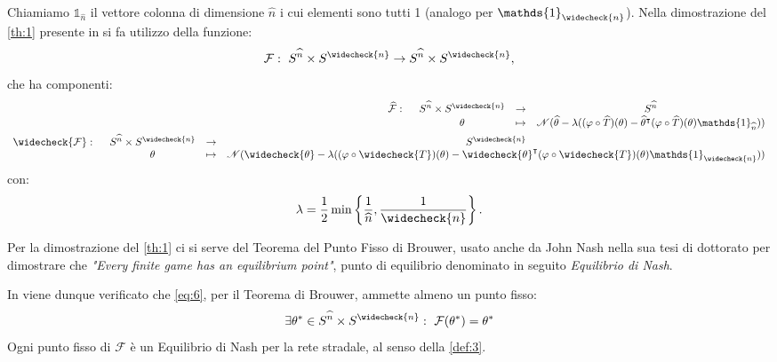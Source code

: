 Chiamiamo $\mathds{1}_{\widehat{n}}$ il vettore colonna di dimensione $\widehat{n}$ i cui elementi sono tutti 1 (analogo per $\mathds{1}_{\widecheck{n}}$).
Nella dimostrazione del \autoref{th:1} presente in \cite[Cap. 4]{MR4911797} si fa utilizzo della funzione:
\begin{equation}
    \mathcal{F}:\text{ } S^{\widehat{n}}\times S^{\widecheck{n}} \to S^{\widehat{n}}\times S^{\widecheck{n}},
    \label{eq:6}
\end{equation}
che ha componenti:
\begin{equation}
    \begin{split}
    \begin{array}{l c c c}
        \widehat{\mathcal{F}}:\text{ } & S^{\widehat{n}}\times S^{\widecheck{n}} & \to & S^{\widehat{n}}\\
        & \theta & \mapsto & \mathscr{N}(\widehat{\theta} - \lambda((\varphi\circ\widehat{T})(\theta)-\widehat{\theta}^{\intercal}(\varphi\circ\widehat{T})(\theta)\mathds{1}_{\widehat{n}})) 
    \end{array}\\
    \begin{array}{l c c c}
        \widecheck{\mathcal{F}}:\text{ } & S^{\widehat{n}}\times S^{\widecheck{n}} & \to & S^{\widecheck{n}}\\
        & \theta & \mapsto & \mathscr{N}(\widecheck{\theta} - \lambda((\varphi\circ\widecheck{T})(\theta)-\widecheck{\theta}^{\intercal}(\varphi\circ\widecheck{T})(\theta)\mathds{1}_{\widecheck{n}})) 
    \end{array}
    \end{split}
    \label{eq:7}
\end{equation}
con:
\begin{equation}
    \lambda=\frac{1}{2}\min\left\{\frac{1}{\widehat{n}},\frac{1}{\widecheck{n}}\right\}.
    \label{eq:8}
\end{equation}

Per la dimostrazione del \autoref{th:1} ci si serve del Teorema del Punto Fisso di Brouwer, usato anche da John Nash nella sua tesi di
dottorato \cite[Cap. 3]{nash1950noncooperative} per dimostrare che \textit{"Every finite game has an equilibrium point"}, punto di equilibrio
denominato in seguito \textit{Equilibrio di Nash}.

In \cite{MR4911797} viene dunque verificato che \autoref{eq:6}, per il Teorema di Brouwer, ammette almeno un punto fisso:
\begin{equation}
    \exists\theta^*\in S^{\widehat{n}}\times S^{\widecheck{n}}:\text{ } \mathcal{F}(\theta^*)=\theta^*
    \label{eq:9}
\end{equation}
Ogni punto fisso di $\mathcal{F}$ è un Equilibrio di Nash per la rete stradale, al senso della \autoref{def:3}.
